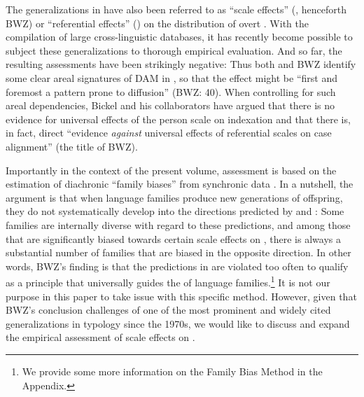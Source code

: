 \documentclass[output=paper]{langscibook}
\begin{document}
The generalizations in  have also been referred to as “scale effects”  (\citealt{Bickeletal2015Typological}, henceforth BWZ) or “referential effects” (\eg \citealt{vanLier2012Referential}) on the distribution of overt . With the compilation of large cross-linguistic databases, it has recently become possible to subject these generalizations to thorough empirical evaluation. And so far, the resulting assessments have been strikingly negative: Thus both \citet{Sinnemki2014Typological} and  BWZ identify some clear areal signatures of DAM in , so that the effect might be “first and foremost a pattern prone to diffusion” (BWZ: 40). 
When controlling for such areal dependencies, Bickel and his collaborators have argued that there is no evidence for universal effects of the person scale on indexation \citep{Bickeletal2015Exploring,Witzlack-Makarevichetal2016Decomposing} and that there is, in fact, direct “evidence \textit{against} universal effects of referential scales on case alignment” (\cf the title of BWZ).

Importantly in the context of the present volume, 
assessment is based on the estimation of diachronic “family biases” from synchronic data \citep{Bickel2011Statistical,Bickel2013Distributional}. 
In a nutshell, the argument is that when language families produce new generations of offspring, they do not systematically develop into the directions predicted by  and : Some families are internally diverse with regard to these predictions, and among those that are significantly biased towards certain scale effects on , there is always a substantial number of families that are biased in the opposite direction. In other words, BWZ's finding is that the predictions in  are violated too often to qualify as a principle that universally guides the  of language families.\footnote{We provide some more information on the Family Bias Method in the Appendix.} It is not our purpose in this paper to take issue with this specific method. However, given that BWZ's conclusion challenges of one of the most prominent and widely cited generalizations in typology since the 1970s, we would like to discuss and expand the empirical assessment of scale effects on . 
\end{document}

